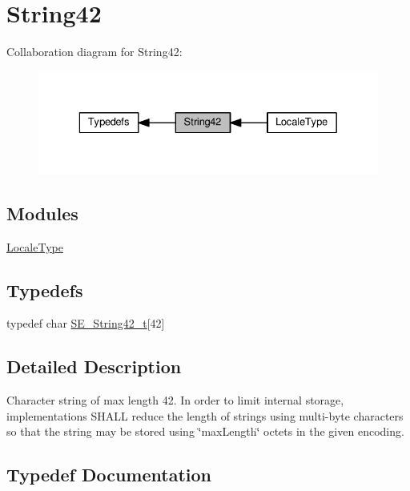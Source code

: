 \hypertarget{group__String42}{}\section{String42}
\label{group__String42}
Collaboration diagram for String42\+:\nopagebreak
\begin{figure}[H]
\begin{center}
\leavevmode
\includegraphics[width=329pt]{group__String42}
\end{center}
\end{figure}
\subsection*{Modules}
\begin{DoxyCompactItemize}
\item 
\hyperlink{group__LocaleType}{Locale\+Type}
\end{DoxyCompactItemize}
\subsection*{Typedefs}
\begin{DoxyCompactItemize}
\item 
typedef char \hyperlink{group__String42_gad5a294b994fa3a024ca6d747f784f0d9}{S\+E\+\_\+\+String42\+\_\+t}\mbox{[}42\mbox{]}
\end{DoxyCompactItemize}


\subsection{Detailed Description}
Character string of max length 42. In order to limit internal storage, implementations S\+H\+A\+LL reduce the length of strings using multi-\/byte characters so that the string may be stored using \char`\"{}max\+Length\char`\"{} octets in the given encoding. 

\subsection{Typedef Documentation}
\mbox{\label{group__String42_gad5a294b994fa3a024ca6d747f784f0d9}} 
